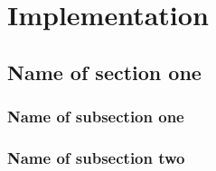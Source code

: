 \chapter{Implementation}

\lipsum[4]

\section{Name of section one}

\lipsum

\subsection{Name of subsection one}

\lipsum

\subsection{Name of subsection two}

\lipsum
